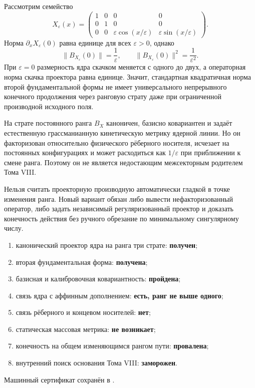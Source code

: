 Рассмотрим семейство
\begin{equation}
 X_\varepsilon(x)=
 \begin{pmatrix}
  1&0&0&0\\
  0&1&0&0\\
  0&0&\varepsilon\cos(x/\varepsilon)&
       \varepsilon\sin(x/\varepsilon)
 \end{pmatrix}.
 \label{eq:v8-moving-kernel-singular-path}
\end{equation}
Норма $\partial_xX_\varepsilon(0)$ равна единице для всех
$\varepsilon>0$, однако
\begin{equation}
 \|B_{X_\varepsilon}(0)\|=\frac1{\varepsilon},
 \qquad
 \|B_{X_\varepsilon}(0)\|^2=\frac1{\varepsilon^2}.
\end{equation}
При $\varepsilon=0$ размерность ядра скачком меняется с одного до двух, а
операторная норма скачка проектора равна единице. Значит, стандартная
квадратичная норма второй фундаментальной формы не имеет универсального
непрерывного конечного продолжения через ранговую страту даже при
ограниченной производной исходного поля.

\begin{theorem}
На страте постоянного ранга $B_X$ каноничен, базисно ковариантен и задаёт
естественную грассманианную кинетическую метрику ядерной линии. Но он
факторизован относительно физического рёберного носителя, исчезает на
постоянных конфигурациях и может расходиться как $1/\varepsilon$ при
приближении к смене ранга. Поэтому он не является недостающим
межсекторным родителем Тома VIII.
\end{theorem}

\begin{nogocriterion}
Нельзя считать проекторную производную автоматически гладкой в точке
изменения ранга. Новый вариант обязан либо вывести нефакторизованный
оператор, либо задать независимый регуляризованный проектор и доказать
конечность действия без ручного обрезание по минимальному сингулярному числу.
\end{nogocriterion}

\begin{protocol}
\begin{enumerate}
 \item канонический проектор ядра на ранга три страте: \textbf{получен};
 \item вторая фундаментальная форма: \textbf{получена};
 \item базисная и калибровочная ковариантность: \textbf{пройдена};
 \item связь ядра с аффинным дополнением: \textbf{есть, ранг не выше одного};
 \item связь рёберного и концевом носителей: \textbf{нет};
 \item статическая массовая метрика: \textbf{не возникает};
 \item конечность на общем изменяющимся рангом пути: \textbf{провалена};
 \item внутренний поиск основания Тома VIII: \textbf{заморожен}.
\end{enumerate}
\end{protocol}

Машинный сертификат сохранён в
.
